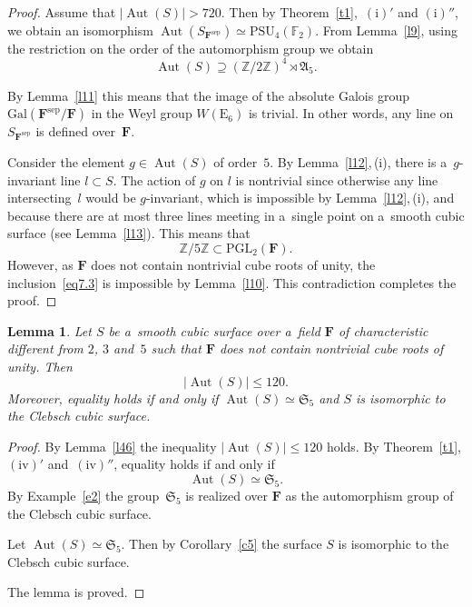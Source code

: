 \documentclass{amsart}
\numberwithin{equation}{section}
\theoremstyle{plain}
\newtheorem{lemma}{Lemma}
\theoremstyle{definition}
\theoremstyle{remark}
\begin{document}
\begin{proof}
Assume that $|{\operatorname{Aut}(S)}| > 720$. Then by Theorem~\ref{t1},~$(\mathrm{i})'$ and $(\mathrm{i})''$, we obtain an isomorphism $\operatorname{Aut}(S_{\mathbf{F}^{\mathrm{sep}}}) \simeq \mathrm{PSU}_4(\mathbb{F}_2)$. From Lemma~\ref{l9}, using the restriction on the order of the automorphism group we obtain
$$
\operatorname{Aut}(S) \supseteq (\mathbb{Z}/2\mathbb{Z})^4 \rtimes \mathfrak{A}_5.
$$

 By Lemma~\ref{l11} this means that the image of the absolute Galois group $\mathrm{Gal}(\mathbf{F}^{\mathrm{sep}}/\mathbf{F})$ in the Weyl group $W(\mathrm{E}_6)$ is trivial. In other words, any line on $S_{\mathbf{F}^{\mathrm{sep}}}$ is defined over~$\mathbf{F}$.

Consider the element $g \in \operatorname{Aut}(S)$ of order~$5$. By Lemma~\ref{l12},\,(i), there is a~$g$-invari\-ant line $l \subset S$. The action of $g$ on $l$ is nontrivial since otherwise any line intersecting~$l$ would be $g$-invariant, which is impossible by Lemma~\ref{l12},\,(i), and because there are at most three lines meeting in a~single point on a~smooth cubic surface (see Lemma~\ref{l13}). This means that
\begin{equation}
\label{eq7.3}
\mathbb{Z}/5\mathbb{Z} \subset \mathrm{PGL}_2(\mathbf{F}).
\end{equation}
However, as $\mathbf{F}$ does not contain nontrivial cube roots of unity, the inclusion~\eqref{eq7.3} is impossible by Lemma~\ref{l10}. This contradiction completes the proof.
\end{proof}

\begin{lemma}
\label{l48}
Let $S$ be a~smooth cubic surface over a~field $\mathbf{F}$ of characteristic different from $2$, $3$ and~$5$ such that $\mathbf{F}$ does not contain nontrivial cube roots of unity. Then
$$
|{\operatorname{Aut}(S)}| \leqslant 120.
$$
Moreover, equality holds if and only if $\operatorname{Aut}(S) \simeq \mathfrak{S}_5$ and $S$ is isomorphic to the Clebsch cubic surface.
\end{lemma}

\begin{proof}
By Lemma~\ref{l46} the inequality $|{\operatorname{Aut}(S)}| \leqslant 120$ holds. By Theorem~\ref{t1}, $(\mathrm{iv})'$ and~$(\mathrm{iv})''$, equality holds if and only if
$$
\operatorname{Aut}(S) \simeq \mathfrak{S}_5.
$$
By Example~\ref{e2} the group~$\mathfrak{S}_5$ is realized over $\mathbf{F}$ as the automorphism group of the Clebsch cubic surface.

Let $\operatorname{Aut}(S) \simeq \mathfrak{S}_5$. Then by Corollary~\ref{c5} the surface $S$ is isomorphic to the Clebsch cubic surface.

The lemma is proved.
\end{proof}
\end{document}
